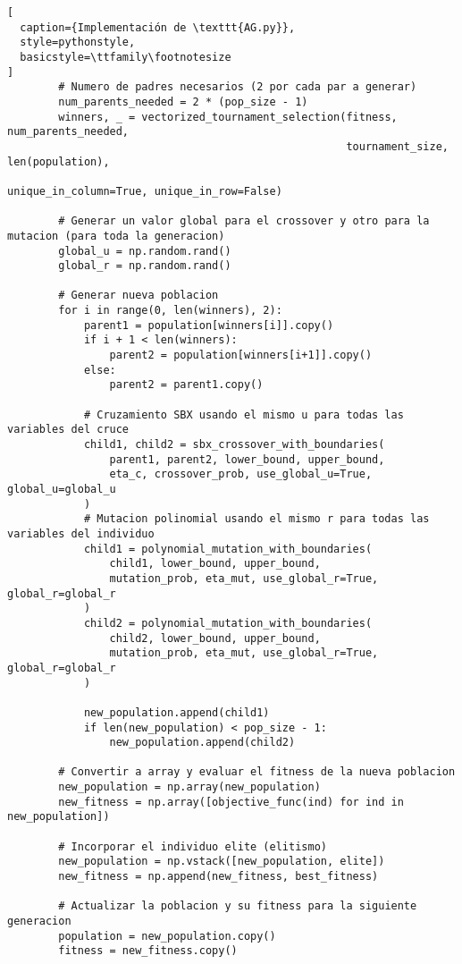 \begin{lstlisting}[
  caption={Implementación de \texttt{AG.py}},
  style=pythonstyle,
  basicstyle=\ttfamily\footnotesize
]
        # Numero de padres necesarios (2 por cada par a generar)
        num_parents_needed = 2 * (pop_size - 1)
        winners, _ = vectorized_tournament_selection(fitness, num_parents_needed,
                                                     tournament_size, len(population),
                                                     unique_in_column=True, unique_in_row=False)
        
        # Generar un valor global para el crossover y otro para la mutacion (para toda la generacion)
        global_u = np.random.rand()
        global_r = np.random.rand()
        
        # Generar nueva poblacion
        for i in range(0, len(winners), 2):
            parent1 = population[winners[i]].copy()
            if i + 1 < len(winners):
                parent2 = population[winners[i+1]].copy()
            else:
                parent2 = parent1.copy()
            
            # Cruzamiento SBX usando el mismo u para todas las variables del cruce
            child1, child2 = sbx_crossover_with_boundaries(
                parent1, parent2, lower_bound, upper_bound,
                eta_c, crossover_prob, use_global_u=True, global_u=global_u
            )
            # Mutacion polinomial usando el mismo r para todas las variables del individuo
            child1 = polynomial_mutation_with_boundaries(
                child1, lower_bound, upper_bound,
                mutation_prob, eta_mut, use_global_r=True, global_r=global_r
            )
            child2 = polynomial_mutation_with_boundaries(
                child2, lower_bound, upper_bound,
                mutation_prob, eta_mut, use_global_r=True, global_r=global_r
            )
            
            new_population.append(child1)
            if len(new_population) < pop_size - 1:
                new_population.append(child2)
        
        # Convertir a array y evaluar el fitness de la nueva poblacion
        new_population = np.array(new_population)
        new_fitness = np.array([objective_func(ind) for ind in new_population])
        
        # Incorporar el individuo elite (elitismo)
        new_population = np.vstack([new_population, elite])
        new_fitness = np.append(new_fitness, best_fitness)
        
        # Actualizar la poblacion y su fitness para la siguiente generacion
        population = new_population.copy()
        fitness = new_fitness.copy()
    

\end{lstlisting}
